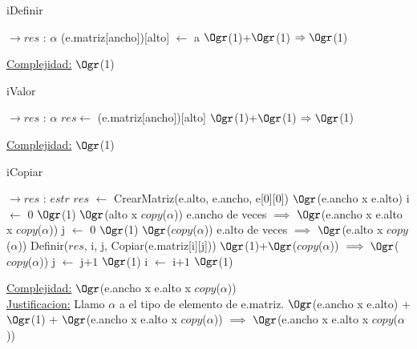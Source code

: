 \begin{Representacion}
\begin{Algoritmos}
\begin{algorithm}[H]
	\end{algorithm}
	
	\begin{algorithm}[H]
		\caption{iDefinir}
		
		\begin{algorithmic}[1]
			 $\to res$ : $\alpha$
			\State (e.matriz[ancho])[alto] $\leftarrow$ a \Comment $\Ogr$(1)+$\Ogr$(1) $\Rightarrow \Ogr$(1)
			\EndProcedure
		\end{algorithmic}
		\underline{Complejidad:} $\Ogr$(1)
		
	\end{algorithm}
	
	\begin{algorithm}[H]
		\caption{iValor}
		
		\begin{algorithmic}[1]
			 $\to res$ : $\alpha$
			\State $res \leftarrow$ (e.matriz[ancho])[alto] \Comment $\Ogr$(1)+$\Ogr$(1) $\Rightarrow \Ogr$(1)
			\EndProcedure
		\end{algorithmic}
		\underline{Complejidad:} $\Ogr$(1)
		
	\end{algorithm}
	
	\begin{algorithm}[H]
		\caption{iCopiar}
		
		\begin{algorithmic}[1]
			 $\to res$ : $estr$
			\State $res$ $\leftarrow$ CrearMatriz(e.alto, e.ancho, e[0][0]) \Comment $\Ogr$(e.ancho x e.alto)
			\State i $\leftarrow$ $0$ \Comment $\Ogr$(1)
			 \Comment $\Ogr$(alto x $copy$($\alpha$)) e.ancho de veces $\implies$ $\Ogr$(e.ancho x e.alto x $copy$($\alpha$))
				\State j $\leftarrow$ $0$ \Comment $\Ogr$(1)
				 \Comment $\Ogr$($copy$($\alpha$)) e.alto de veces $\implies$  $\Ogr$(e.alto x $copy$($\alpha$))
					\State Definir($res$, i, j, Copiar(e.matriz[i][j])) \Comment $\Ogr$(1)+$\Ogr$($copy$($\alpha$)) $\implies \Ogr$($copy$($\alpha$))
					\State j $\leftarrow$ j$+1$ \Comment $\Ogr$(1)
				\EndWhile
				\State i $\leftarrow$ i$+1$ \Comment $\Ogr$(1)
			\EndWhile
			\EndProcedure
		\end{algorithmic}
		\underline{Complejidad:} $\Ogr$(e.ancho x e.alto x $copy$($\alpha$))
		\\
		\underline{Justificacion:} Llamo $\alpha$ a el tipo de elemento de e.matriz. $\Ogr$(e.ancho x e.alto) + $\Ogr$(1) + $\Ogr$(e.ancho x e.alto x $copy$($\alpha$)) $\implies$ $\Ogr$(e.ancho x e.alto x $copy$($\alpha$))
		

\end{algorithm}
\end{Algoritmos}
\end{Representacion}
